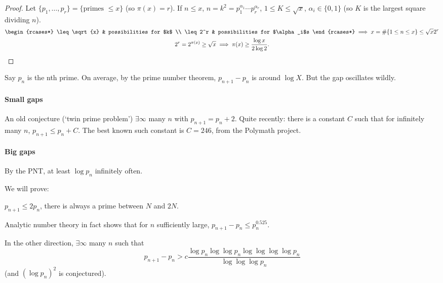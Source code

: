 \documentclass{article}
\begin{document}
\begin{proof}
    Let $\{p_1, \dotsc, p_r\} = \{\text{primes } \leq x\}$ (so $\pi(x) = r$).
    If $n \leq x$, $n = k^2 = p_1^{\alpha_1} \dotsm p_r^{\alpha_r}$, $1 \leq K \leq \sqrt{x}$, $\alpha_i \in \{0, 1\}$ (so $K$ is the largest square dividing $n$).
    \begin{gather*}
        \begin{rcases*}
            \leq \sqrt{x} & possibilities for $k$ \\
            \leq 2^r & possibilities for $\alpha_i$s
        \end{rcases*}
        \implies x = \#\{1 \leq n \leq x\} \leq \sqrt{x} 2^r \\
        2^r = 2^{\pi(x)} \geq \sqrt{x} \implies \pi(x) \geq \frac{\log{x}}{2 \log 2}.
    \end{gather*}
\end{proof}

Say $p_n$ is the nth prime.
On average, by the prime number theorem, $p_{n+1} - p_n$ is around $\log X$. But the gap oscillates wildly.

\paragraph{Small gaps} An old conjecture (`twin prime problem') $\exists \infty$ many $n$ with $p_{n+1} = p_n + 2$.
Quite recently: there is a constant $C$ such that for infinitely many $n$, $p_{n+1} \leq p_n + C$.
The best known such constant is $C=246$, from the Polymath project.

\paragraph{Big gaps} By the PNT, at least $\log p_n$ infinitely often.

We will prove:
\begin{thm}
    $p_{n+1} \leq 2 p_n$, there is always a prime between $N$ and $2N$.
\end{thm}

Analytic number theory in fact shows that for $n$ sufficiently large, $p_{n+1} - p_n \leq p_n^{0.525}$.

In the other direction, $\exists \infty$ many $n$ such that
\begin{equation*}
    p_{n+1} - p_n > c \frac{\log p_n \log \log p_n \log \log \log \log p_n}{\log \log \log p_n}
\end{equation*}
(and $(\log p_n)^2$ is conjectured).
\end{document}
